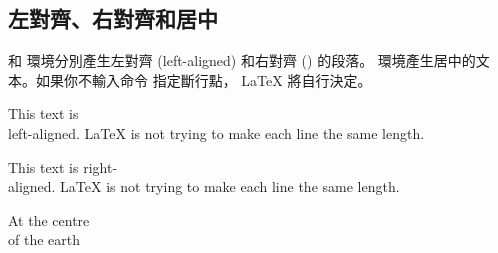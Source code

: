 \subsection{左對齊、右對齊和居中}
 和  環境分別產生左對齊 (left-aligned) 和右對齊 () 的段落。 環境產生居中的文本。如果你不輸入命令 \ci{\bs} 指定斷行點，
  \LaTeX{} 將自行決定。

\begin{example}
\begin{flushleft}
This text is\\ left-aligned.
\LaTeX{} is not trying to make
each line the same length.
\end{flushleft}
\end{example}

\begin{example}
\begin{flushright}
This text is right-\\aligned.
\LaTeX{} is not trying to make
each line the same length.
\end{flushright}
\end{example}

\begin{example}
\begin{center}
At the centre\\of the earth
\end{center}
\end{example}

